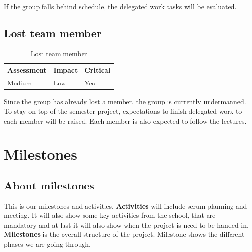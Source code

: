 If the group falls behind schedule, the delegated work tasks will be evaluated.

\subsection{Lost team member}

\begin{table}[H]
    \begin{tabularx}{\textwidth}{|>{\RaggedRight}X|>{\RaggedRight}X|>{\RaggedRight}X|}
        \hline
        \textbf{Assessment} & \textbf{Impact} & \textbf{Critical} \\
        \hline
        Medium & Low & Yes \\
        \hline
    \end{tabularx}
    \caption{Lost team member} 
    \label{table:lost_team_member}
\end{table} 

Since the group has already lost a member, the group is currently undermanned.
To stay on top of the semester project, expectations to finish delegated work to
each member will be raised. Each member is also expected to follow the lectures.

\section{Milestones}

\subsection{About milestones}
This is our milestones and activities.  
\textbf{Activities} will include scrum planning and meeting.
It will also show some key activities from the school, that are mandatory
and at last it will also show when the project is need to be handed in.  
\textbf{Milestones} is the overall structure of the project.
Milestone shows the different phases we are going through.

